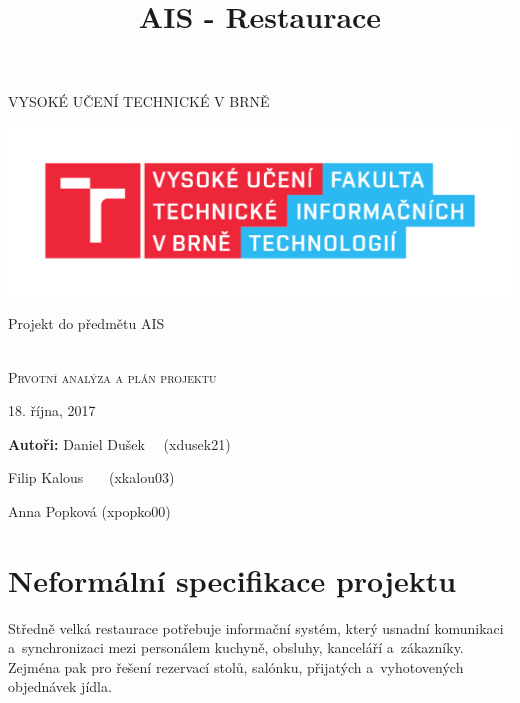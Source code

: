 \documentclass[a4paper,10pt]{article}
\title{AIS - Restaurace}
\begin{document}
\providecommand{\uv}[1]{\quotedblbase #1\textquotedblleft}

\renewcommand{\figurename}{Obrázek}
\newcommand\textbox[1]{
	\parbox{.5\textwidth}{#1}
}

\thispagestyle{plain}
	\begin{center}
		\Huge
		VYSOKÉ UČENÍ TECHNICKÉ V BRNĚ \\


	\includegraphics[width=\textwidth]{resources/fit-logo.pdf}



		\Large{Projekt do předmětu AIS \\ ~ \\}
		
		\LARGE
		\textsc{Prvotní analýza a plán projektu}

	\end{center}

	\noindent \textbox{18. října, 2017} \textbox{\hfill \textbf{Autoři:}  Daniel Dušek ~~(xdusek21) ~~~}
	\noindent \textbox{\hfill} \textbox{\hfill Filip Kalous ~~~(xkalou03) ~~~}
	\noindent \textbox{\hfill} \textbox{\hfill Anna Popková (xpopko00)~~~}

	\clearpage
	\restoregeometry

\newpage

\normalsize

\newpage
\thispagestyle{empty}
\section*{Neformální specifikace projektu}
Středně velká restaurace potřebuje informační systém, který usnadní komunikaci a~synchronizaci mezi personálem kuchyně, obsluhy, kanceláří a~zákazníky. Zejména pak pro řešení rezervací stolů, salónku, přijatých a~vyhotovených objednávek jídla.
\end{document}

